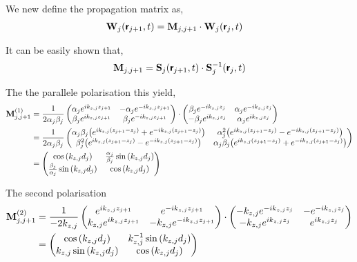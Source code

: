 \newpage

We new define the propagation matrix as,
\begin{align*}
	\vb{W}_{j}\pqty{\boldsymbol{\mathsf{r}}_{j+1},t} &= \vb{M}_{j,j+1} \cdot \vb{W}_{j}\pqty{\boldsymbol{\mathsf{r}}_{j},t}
\end{align*}

It can be easily shown that,
\begin{align*}
	\vb{M}_{j,j+1} = \vb{S}_{j}\pqty{\boldsymbol{\mathsf{r}}_{j+1},t} \cdot \vb{S}^{-1}_{j}\pqty{\boldsymbol{\mathsf{r}}_{j},t}
\end{align*}

The the parallele polarisation this yield,
\begin{align*}
	\vb{M}^{(1)}_{j,j+1} 
		&= \frac{1}{2\alpha_j\beta_j}\pmqty{
		\alpha_j e^{ik_{z,j}z_{j+1}} & 
		-\alpha_j e^{-ik_{z,j}z_{j+1}} \\
		\beta_j e^{ik_{z,j}z_{j+1}} & 
		\beta_j e^{-ik_{z,j}z_{j+1}}
		} \cdot \pmqty{
		\beta_j e^{-ik_{z,j}z_j} & 
		\alpha_j e^{-ik_{z,j}z_j} \\
		-\beta_j e^{ik_{z,j}z_j} & 
		\alpha_j e^{ik_{z,j}z_j}
		}
		 \\
		&= \frac{1}{2\alpha_j\beta_j}\pmqty{
		\alpha_j\beta_j \pqty{e^{ik_{z,j}\pqty{z_{j+1}-z_{j}}} + e^{-ik_{z,j}\pqty{z_{j+1}-z_{j}}}} &
		\alpha_j^2 \pqty{e^{ik_{z,j}\pqty{z_{j+1}-z_{j}}} - e^{-ik_{z,j}\pqty{z_{j+1}-z_{j}}}} \\
		\beta_j^2 \pqty{e^{ik_{z,j}\pqty{z_{j+1}-z_{j}}} - e^{-ik_{z,j}\pqty{z_{j+1}-z_{j}}}} &
		\alpha_j\beta_j \pqty{e^{ik_{z,j}\pqty{z_{j+1}-z_{j}}} + e^{-ik_{z,j}\pqty{z_{j+1}-z_{j}}}}
		} \\
		&= \pmqty{
		\cos\pqty{k_{z,j}d_j} &
		\frac{\alpha_j}{\beta_j} \sin\pqty{k_{z,j}d_j} \\
		\frac{\beta_j}{\alpha_j} \sin\pqty{k_{z,j}d_j} &
		\cos\pqty{k_{z,j}d_j}
		}
\end{align*}

The second polarisation
\begin{align*}
	\vb{M}^{(2)}_{j,j+1} 
		&= \frac{1}{-2k_{z,j}}\pmqty{
		e^{ik_{z,j}z_{j+1}} & 
		e^{-ik_{z,j}z_{j+1}}  \\
		k_{z,j} e^{ik_{z,j}z_{j+1}} & 
		-k_{z,j} e^{-ik_{z,j}z_{j+1}}
		} \cdot
		\pmqty{
		-k_{z,j} e^{-ik_{z,j}z_j} & 
		-e^{-ik_{z,j}z_j}  \\
		-k_{z,j} e^{ik_{z,j}z_j} & 
		e^{ik_{z,j}z_j}
		} \\
		&= \pmqty{
		\cos\pqty{k_{z,j}d_j} & 
		k_{z,j}^{-1}\sin\pqty{k_{z,j}d_j} \\
		k_{z,j}\sin\pqty{k_{z,j}d_j} &
		\cos\pqty{k_{z,j}d_j}
		}
\end{align*}

